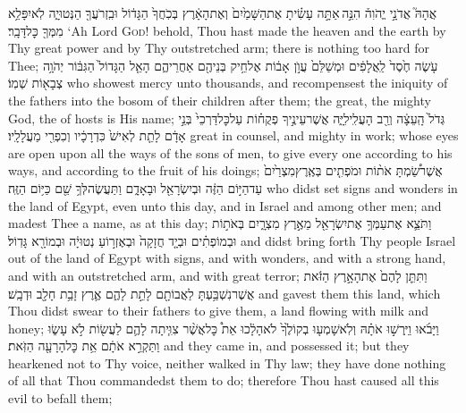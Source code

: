 {אֲהָהּ֮ אֲדֹנָ֣י יֱהֹוִה֒ הִנֵּ֣ה \legarmeh  אַתָּ֣ה עָשִׂ֗יתָ אֶת\maqqaf הַשָּׁמַ֙יִם֙ וְאֶת\maqqaf הָאָ֔רֶץ בְּכֹֽחֲךָ֙ הַגָּד֔וֹל וּבִֽזְרֹעֲךָ֖ הַנְּטוּיָ֑ה לֹֽא\maqqaf יִפָּלֵ֥א מִמְּךָ֖ כׇּל\maqqaf דָּבָֽר׃}
{‘Ah Lord \textsc{God}! behold, Thou hast made the heaven and the earth by Thy great power and by Thy outstretched arm; there is nothing too hard for Thee;}
{עֹ֤שֶׂה חֶ֙סֶד֙ לַֽאֲלָפִ֔ים וּמְשַׁלֵּם֙ עֲוֺ֣ן אָב֔וֹת אֶל\maqqaf חֵ֥יק בְּנֵיהֶ֖ם אַחֲרֵיהֶ֑ם הָאֵ֤ל הַגָּדוֹל֙ הַגִּבּ֔וֹר יְהֹוָ֥ה צְבָא֖וֹת שְׁמֽוֹ׃}
{who showest mercy unto thousands, and recompensest the iniquity of the fathers into the bosom of their children after them; the great, the mighty God, the \lord\space of hosts is His name;}
{גְּדֹל֙ הָֽעֵצָ֔ה וְרַ֖ב הָעֲלִֽילִיָּ֑ה אֲשֶׁר\maqqaf עֵינֶ֣יךָ פְקֻח֗וֹת עַל\maqqaf כׇּל\maqqaf דַּרְכֵי֙ בְּנֵ֣י אָדָ֔ם לָתֵ֤ת לְאִישׁ֙ כִּדְרָכָ֔יו וְכִפְרִ֖י מַעֲלָלָֽיו׃}
{great in counsel, and mighty in work; whose eyes are open upon all the ways of the sons of men, to give every one according to his ways, and according to the fruit of his doings;}
{אֲשֶׁר\maqqaf שַׂ֠מְתָּ אֹת֨וֹת וּמֹפְתִ֤ים בְּאֶֽרֶץ\maqqaf מִצְרַ֙יִם֙ עַד\maqqaf הַיּ֣וֹם הַזֶּ֔ה וּבְיִשְׂרָאֵ֖ל וּבָאָדָ֑ם וַתַּעֲשֶׂה\maqqaf לְּךָ֥ שֵׁ֖ם כַּיּ֥וֹם הַזֶּֽה׃}
{who didst set signs and wonders in the land of Egypt, even unto this day, and in Israel and among other men; and madest Thee a name, as at this day;}
{וַתֹּצֵ֛א אֶת\maqqaf עַמְּךָ֥ אֶת\maqqaf יִשְׂרָאֵ֖ל מֵאֶ֣רֶץ מִצְרָ֑יִם בְּאֹת֣וֹת וּבְמוֹפְתִ֗ים וּבְיָ֤ד חֲזָקָה֙ וּבְאֶזְר֣וֹעַ נְטוּיָ֔ה וּבְמוֹרָ֖א גָּדֽוֹל׃}
{and didst bring forth Thy people Israel out of the land of Egypt with signs, and with wonders, and with a strong hand, and with an outstretched arm, and with great terror;}
{וַתִּתֵּ֤ן לָהֶם֙ אֶת\maqqaf הָאָ֣רֶץ הַזֹּ֔את אֲשֶׁר\maqqaf נִשְׁבַּ֥עְתָּ לַאֲבוֹתָ֖ם לָתֵ֣ת לָהֶ֑ם אֶ֛רֶץ זָבַ֥ת חָלָ֖ב וּדְבָֽשׁ׃}
{and gavest them this land, which Thou didst swear to their fathers to give them, a land flowing with milk and honey;}
{וַיָּבֹ֜אוּ וַיִּֽרְשׁ֣וּ אֹתָ֗הּ וְלֹֽא\maqqaf שָׁמְע֤וּ בְקוֹלֶ֙ךָ֙  לֹא\maqqaf הָלָ֔כוּ אֵת֩ כׇּל\maqqaf אֲשֶׁ֨ר צִוִּ֧יתָה לָהֶ֛ם לַעֲשׂ֖וֹת לֹ֣א עָשׂ֑וּ וַתַּקְרֵ֣א אֹתָ֔ם אֵ֥ת כׇּל\maqqaf הָרָעָ֖ה הַזֹּֽאת׃}
{and they came in, and possessed it; but they hearkened not to Thy voice, neither walked in Thy law; they have done nothing of all that Thou commandedst them to do; therefore Thou hast caused all this evil to befall them;}
